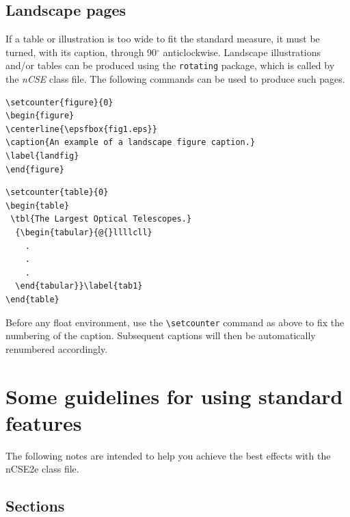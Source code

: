 \documentclass{nCSE2e}
\begin{document}
\subsection{Landscape pages}\label{eps}

If a table or illustration is too wide to fit the standard measure, it must be turned, with its caption,
through 90$^{\circ}$ anticlockwise. Landscape illustrations and/or tables can be produced using
the \verb"rotating" package, which is called by the \textit{nCSE} class file. The following commands can
be used to produce such pages.
%
\begin{verbatim}
\setcounter{figure}{0}
\begin{figure}
\centerline{\epsfbox{fig1.eps}}
\caption{An example of a landscape figure caption.}
\label{landfig}
\end{figure}
\end{verbatim}

\begin{verbatim}
\setcounter{table}{0}
\begin{table}
 \tbl{The Largest Optical Telescopes.}
  {\begin{tabular}{@{}llllcll}
    .
    .
    .
  \end{tabular}}\label{tab1}
\end{table}
\end{verbatim}
%
Before any float environment, use the \verb"\setcounter" command
as above to fix the numbering of the caption. Subsequent captions
will then be automatically renumbered accordingly.


\section[]{Some guidelines for using standard features}

The following notes are intended to help you achieve the best effects with the nCSE2e class file.


\subsection{Sections}
\end{document}
